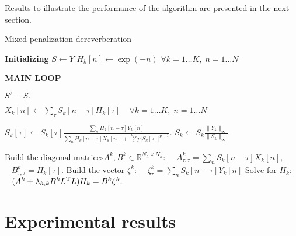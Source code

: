 \documentclass[12pt]{article}
\newcommand\NoDo{\renewcommand\algorithmicdo{}}
\newcommand\NoThen{\renewcommand\algorithmicthen{}}
\newcommand{\T}{^{\text{\scriptsize{T}}}}
\begin{document}
Results to illustrate the performance of the algorithm are presented in the next section.

\begin{algorithm}
\caption{Mixed penalization dereverberation}
\label{al:mixpen}
\begin{algorithmic}[1]
\NoDo
\NoThen
\STATE  \textbf{Initializing}
\STATE $S \leftarrow Y$
\STATE $H_k[n] \leftarrow \exp( -n)$  \;\;  $ \forall k = 1\ldots K, \;n = 1\ldots N$
\STATE $ $

\STATE \textbf{MAIN LOOP}

	\vspace{0.4cm}
	\STATE $S' = S.$
	\vspace{0.4cm}

	\STATE $\displaystyle{X_k[n] \leftarrow \sum_{\tau} S_k[n-\tau] H_k[\tau]} \;\; \;\; \forall k = 1\ldots K, \;n = 1\ldots N$
	\vspace{0.4cm}	

			\STATE $\displaystyle{S_k[\tau] \leftarrow S_k[\tau]\frac{\sum_n H_k[n-\tau]Y_k[n]}{\sum_n H_k[n-\tau]X_k[n] \,+\,\frac{\lambda_{s,k}}{2}p|S_k[\tau]|^{p-1}}}.$
		\ENDFOR
		\STATE $\displaystyle{S_k \leftarrow S_k \frac{\|Y_k\|_{\infty}}{\|S_k\|_{\infty}}.}$
	\ENDFOR
	\vspace{0.4cm}
	
		\STATE$\text{Build the diagonal matrices} A^k,B^k\in\mathbb{R}^{N_h\times N_h}:$
		\STATE$\;\;\; A^k_{\tau ,\tau} = \sum_{n}S_k[n-\tau]X_k[n],$
		\STATE$\;\;\; B^k _{\tau ,\tau} = H_k[\tau].$
		\STATE$\text{Build the vector } \zeta^k:$
		\STATE$\;\;\; \zeta^k_\tau = \sum_{n}S_k[n-\tau]Y_k[n]$
		\STATE$\text{Solve for } H_k:$
		\STATE$\;\;\;  \displaystyle{(A^k+\lambda_{h,k}B^kL\T L)H_k = B^k\zeta^k.}$
	\ENDFOR
	\vspace{0.4cm}

		\RETURN
	\ENDIF
	\vspace{0.4cm}
\ENDFOR

\end{algorithmic}
\end{algorithm}



\section{Experimental results}
\end{document}
